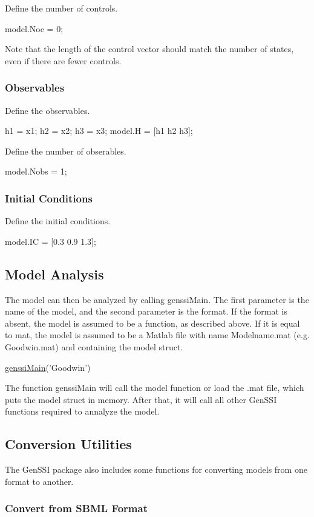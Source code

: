 Define the number of controls.


\begin{DoxyCode}
model.Noc = 0; 
\end{DoxyCode}


Note that the length of the control vector should match the number of states, even if there are fewer controls.\hypertarget{def_simu_obserables}{}\subsubsection{Observables}\label{def_simu_obserables}
Define the observables.


\begin{DoxyCode}
h1 = x1;
h2 = x2;
h3 = x3;
model.H = [h1 h2 h3];
\end{DoxyCode}


Define the number of obserables.


\begin{DoxyCode}
model.Nobs = 1; 
\end{DoxyCode}
\hypertarget{def_simu_ic}{}\subsubsection{Initial Conditions}\label{def_simu_ic}
Define the initial conditions.


\begin{DoxyCode}
model.IC = [0.3 0.9 1.3];
\end{DoxyCode}
\hypertarget{def_simu_analysis}{}\subsection{Model Analysis}\label{def_simu_analysis}
The model can then be analyzed by calling genssi\+Main. The first parameter is the name of the model, and the second parameter is the format. If the format is absent, the model is assumed to be a function, as described above. If it is equal to \textquotesingle{}mat\textquotesingle{}, the model is assumed to be a Matlab file with name Modelname.\+mat (e.\+g. Goodwin.\+mat) and containing the model struct.


\begin{DoxyCode}
\hyperlink{genssi_main_8m_aac78e2620e69e2ecf610a2526a32c7fb}{genssiMain}(\textcolor{stringliteral}{'Goodwin'})
\end{DoxyCode}


The function genssi\+Main will call the model function or load the .mat file, which puts the model struct in memory. After that, it will call all other Gen\+S\+SI functions required to annalyze the model.\hypertarget{def_simu_conversion}{}\subsection{Conversion Utilities}\label{def_simu_conversion}
The Gen\+S\+SI package also includes some functions for converting models from one format to another.\hypertarget{def_simu_fromsbml}{}\subsubsection{Convert from S\+B\+M\+L Format}\label{def_simu_fromsbml}

